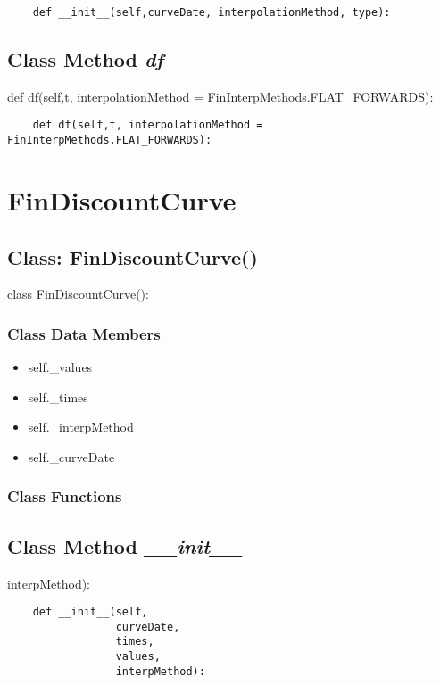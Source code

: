 \documentclass[twoside,11pt]{book}
\begin{document}
\begin{lstlisting}
    def __init__(self,curveDate, interpolationMethod, type):
\end{lstlisting}

\subsection{Class Method {\it df}}
def df(self,t, interpolationMethod = FinInterpMethods.FLAT\_FORWARDS):

\begin{lstlisting}
    def df(self,t, interpolationMethod = FinInterpMethods.FLAT_FORWARDS):
\end{lstlisting}

\newpage
\section{FinDiscountCurve}

\subsection{Class: FinDiscountCurve()}
class FinDiscountCurve():

\subsubsection{Class Data Members}
\begin{itemize}
\item{self.\_values}
\item{self.\_times}
\item{self.\_interpMethod}
\item{self.\_curveDate}
\end{itemize}

\subsubsection{Class Functions}

\subsection{Class Method {\it \_\_init\_\_}}
interpMethod):

\begin{lstlisting}
    def __init__(self,
                 curveDate,
                 times,
                 values,
                 interpMethod):
\end{lstlisting}
\end{document}

